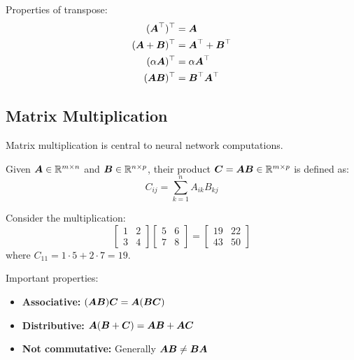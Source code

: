 Properties of transpose:
\begin{align}
    (\boldsymbol{A}^\top)^\top &= \boldsymbol{A} \\
    (\boldsymbol{A} + \boldsymbol{B})^\top &= \boldsymbol{A}^\top + \boldsymbol{B}^\top \\
    (\alpha\boldsymbol{A})^\top &= \alpha\boldsymbol{A}^\top \\
    (\boldsymbol{AB})^\top &= \boldsymbol{B}^\top\boldsymbol{A}^\top
\end{align}

\subsection{Matrix Multiplication}

Matrix multiplication is central to neural network computations.

\begin{definition}
Given $\boldsymbol{A} \in \mathbb{R}^{m \times n}$ and $\boldsymbol{B} \in \mathbb{R}^{n \times p}$, their product $\boldsymbol{C} = \boldsymbol{AB} \in \mathbb{R}^{m \times p}$ is defined as:
\begin{equation}
    C_{ij} = \sum_{k=1}^{n} A_{ik}B_{kj}
\end{equation}
\end{definition}

\begin{example}
Consider the multiplication:
\begin{equation}
    \begin{bmatrix} 1 & 2 \\ 3 & 4 \end{bmatrix}
    \begin{bmatrix} 5 & 6 \\ 7 & 8 \end{bmatrix}
    = \begin{bmatrix} 19 & 22 \\ 43 & 50 \end{bmatrix}
\end{equation}
where $C_{11} = 1 \cdot 5 + 2 \cdot 7 = 19$.
\end{example}

Important properties:
\begin{itemize}
    \item \textbf{Associative:} $(\boldsymbol{AB})\boldsymbol{C} = \boldsymbol{A}(\boldsymbol{BC})$
    \item \textbf{Distributive:} $\boldsymbol{A}(\boldsymbol{B} + \boldsymbol{C}) = \boldsymbol{AB} + \boldsymbol{AC}$
    \item \textbf{Not commutative:} Generally $\boldsymbol{AB} \neq \boldsymbol{BA}$
\end{itemize}

